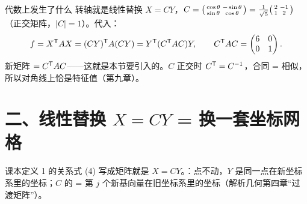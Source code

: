 \documentclass[11pt,a4paper,oneside,openany,fontset=none]{ctexbook}
\begin{document}
\begin{thmbox}{代数上发生了什么}
转轴就是线性替换 $X=CY$，$C=\begin{psmallmatrix}\cos\theta&-\sin\theta\\\sin\theta&\cos\theta\end{psmallmatrix}=\frac1{\sqrt5}\begin{psmallmatrix}2&-1\\1&2\end{psmallmatrix}$（正交矩阵，$|C|=1$）。代入：
\[
f=X^{\mathsf T} AX=(CY)^{\mathsf T} A(CY)=Y^{\mathsf T}(C^{\mathsf T} AC)Y,\qquad C^{\mathsf T} AC=\begin{pmatrix}6&0\\0&1\end{pmatrix}.
\]
\ji 新矩阵 $=C^{\mathsf T} AC$——这就是本节要引入的。$C$ 正交时 $C^{\mathsf T}=C^{-1}$，合同 = 相似，所以对角线上恰是特征值（第九章）。
\end{thmbox}

\section*{二、线性替换 $X=CY$ = 换一套坐标网格}

课本定义 1 的关系式 (4) 写成矩阵就是 $X=CY$。：点不动，$Y$ 是同一点在新坐标系里的坐标；$C$ 的 = 第 $j$ 个新基向量在旧坐标系里的坐标（解析几何第四章“过渡矩阵”）。
\end{document}
